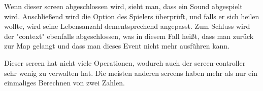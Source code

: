 Wenn dieser screen abgeschlossen wird, sieht man, dass ein Sound abgespielt wird.
Anschließend wird die Option des Spielers überprüft, und falls er sich heilen wollte, wird seine Lebensanzahl dementsprechend angepasst.
Zum Schluss wird der "context" ebenfalls abgeschlossen, was in diesem Fall heißt, dass man zurück zur Map gelangt und dass man dieses Event nicht mehr ausführen kann.

Dieser screen hat nicht viele Operationen, wodurch auch der screen-controller sehr wenig zu verwalten hat.
Die meisten anderen screens haben mehr als nur ein einmaliges Berechnen von zwei Zahlen.